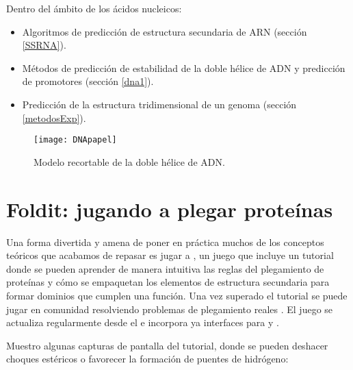 Dentro del \'{a}mbito de los \'{a}cidos nucleicos:
\begin{itemize}

\item Algoritmos de predicci\'{o}n de estructura secundaria de ARN (secci\'{o}n \ref{SSRNA}).

\item M\'{e}todos de predicci\'{o}n de estabilidad de la doble h\'{e}lice de ADN y predicci\'{o}n de promotores (secci\'{o}n \ref{dna1}).

\item Predicci\'{o}n de la estructura tridimensional de un genoma (secci\'{o}n \ref{metodosExp}).
\end{itemize}

\begin{figure}
\begin{center} 
\texttt{[image: DNApapel]}
\caption%
{
Modelo recortable de la doble h\'{e}lice de ADN.
}
\label{fig:DNApapel}
\end{center}
\end{figure}


\section{Foldit: jugando a plegar prote\'{i}nas} \label{foldit}

Una forma divertida y amena de poner en pr\'{a}ctica muchos de los conceptos te\'{o}ricos que acabamos de repasar 
es jugar a , un juego que incluye un tutorial donde 
se pueden aprender de manera intuitiva las reglas del plegamiento de prote\'{i}nas y c\'{o}mo se empaquetan los elementos 
de estructura secundaria para formar dominios que cumplen una funci\'{o}n. Una vez superado el tutorial se puede
jugar en comunidad resolviendo problemas de plegamiento reales \citep{Eiben2012,Khatib2011,Cooper2010}. El juego 
se actualiza regularmente desde el 
e incorpora ya interfaces para  y
.

Muestro algunas capturas de pantalla del tutorial, donde se pueden deshacer choques est\'{e}ricos o favorecer
la formaci\'{o}n de puentes de hidr\'{o}geno:

